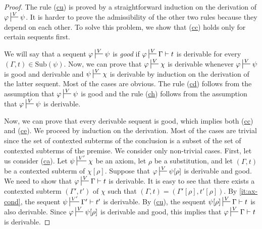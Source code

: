 \documentclass[reqno]{amsart}
\newcommand{\axref}[1]{(\hyperref[ax:#1]{#1})}
\theoremstyle{definition}
\theoremstyle{remark}
\newcommand{\fs}[1]{\mathrm{#1}}
\newcommand{\sub}{\fs{Sub}}
\numberwithin{figure}{section}
\begin{document}
\begin{proof}
The rule \axref{cu} is proved by a straightforward induction on the derivation of $\varphi \sststile{}{V} \psi$.
It is harder to prove the admissibility of the other two rules because they depend on each other.
To solve this problem, we show that \axref{cc} holds only for certain sequents first.

We will say that a sequent $\varphi \sststile{}{V} \psi$ is \emph{good} if $\varphi \sststile{}{V} \Gamma \vdash t$ is derivable for every $(\Gamma,t) \in \sub(\psi)$.
Now, we can prove that $\varphi \sststile{}{V} \chi$ is derivable whenever $\varphi \sststile{}{V} \psi$ is good and derivable and $\psi \sststile{}{V} \chi$ is derivable by induction on the derivation of the latter sequent.
Most of the cases are obvious.
The rule \axref{cd} follows from the assumption that $\varphi \sststile{}{V} \psi$ is good and the rule \axref{ch} follows from the assumption that $\varphi \sststile{}{V} \psi$ is derivable.

Now, we can prove that every derivable sequent is good, which implies both \axref{cc} and \axref{ce}.
We proceed by induction on the derivation.
Most of the cases are trivial since the set of contexted subterms of the conclusion is a subset of the set of contexted subterms of the premise.
We consider only non-trivial cases.
First, let us consider \axref{ca}.
Let $\psi \sststile{}{V'} \chi$ be an axiom, let $\rho$ be a substitution, and let $(\Gamma,t)$ be a contexted subterm of $\chi[\rho]$.
Suppose that $\varphi \sststile{}{V} \psi[\rho]$ is derivable and good.
We need to show that $\varphi \sststile{}{V} \Gamma \vdash t$ is derivable.
It is easy to see that there exists a contexted subterm $(\Gamma',t')$ of $\chi$ such that $(\Gamma,t) = (\Gamma'[\rho],t'[\rho])$.
By \eqref{it:ax-cond}, the sequent $\psi \sststile{}{V'} \Gamma' \vdash t'$ is derivable.
By \axref{cu}, the sequent $\psi[\rho] \sststile{}{V} \Gamma \vdash t$ is also derivable.
Since $\varphi \sststile{}{V} \psi[\rho]$ is derivable and good, this implies that $\varphi \sststile{}{V} \Gamma \vdash t$ is derivable.


\end{proof}
\end{document}
